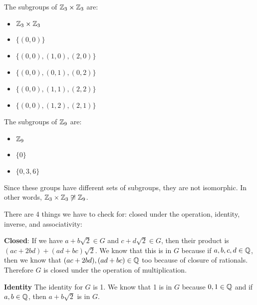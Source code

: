 \documentclass[12pt]{report}
\begin{document}
\sol The subgroups of $\ZZ_3 \times \ZZ_3$ are:
\begin{itemize}
    \item $\ZZ_3 \times \ZZ_3$
    \item $\{ (0,0) \}$
    \item $\{ (0,0), (1, 0), (2, 0)\}$
    \item $\{ (0,0), (0, 1), (0, 2)\}$
    \item $\{ (0,0), (1, 1), (2, 2)\}$
    \item $\{ (0,0), (1, 2), (2, 1)\}$
\end{itemize}

The subgroups of $\ZZ_9$ are: 
\begin{itemize}
    \item $\ZZ_9$
    \item $\{ 0 \}$
    \item $\{ 0, 3, 6 \}$
\end{itemize}

\noindent Since these groups have different sets of subgroups, they are not isomorphic. In other words, $\ZZ_3 \times \ZZ_3 \not \cong \ZZ_9$.

\sol There are 4 things we have to check for: closed under the operation, identity, inverse, and associativity:

\textbf{Closed}: If we have $a + b\sqrt{2} \in G$ and $c + d\sqrt{2} \in G$, then their product is $(ac + 2bd) + (ad + bc)\sqrt{2}$. We know that this is in $G$ because if $a,b,c,d \in \QQ$, then we know that $(ac+2bd),(ad+bc) \in \QQ$ too because of closure of rationals. Therefore $G$ is closed under the operation of multiplication.

\textbf{Identity} The identity for $G$ is 1. We know that 1 is in $G$ because $0,1 \in \QQ$ and if $a,b \in \QQ$, then $a + b\sqrt{2}$ is in $G$.

\sol

\sol

\sol
\end{document}
